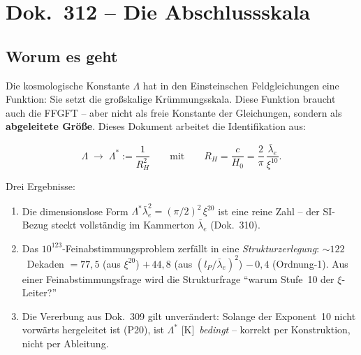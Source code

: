 \maketitle
\tableofcontents

\chapter*{Dok.~312 -- Die Abschlussskala}

\section*{Worum es geht}

Die kosmologische Konstante $\Lambda$ hat in den Einsteinschen
Feldgleichungen eine Funktion: Sie setzt die großskalige Krümmungsskala.
Diese Funktion braucht auch die FFGFT -- aber nicht als freie Konstante
der Gleichungen, sondern als \textbf{abgeleitete Größe}. Dieses Dokument
arbeitet die Identifikation aus:

\[
  \Lambda \;\longrightarrow\; \Lambda^{*} := \frac{1}{R_H^2}
  \qquad\text{mit}\qquad
  R_H = \frac{c}{H_0} = \frac{2}{\pi}\,\frac{\bar\lambda_e}{\xi^{10}}.
\]

Drei Ergebnisse:
\begin{enumerate}
  \item Die dimensionslose Form
        $\Lambda^{*}\bar\lambda_e^{2} = (\pi/2)^{2}\,\xi^{20}$
        ist eine reine Zahl -- der SI-Bezug steckt vollständig im
        Kammerton $\bar\lambda_e$ (Dok.~310).
  \item Das $10^{123}$-Feinabstimmungsproblem zerfällt in eine
        \emph{Strukturzerlegung}: $\sim\!122$~Dekaden
        $= 77{,}5$ (aus $\xi^{20}$) $+\,44{,}8$ (aus
        $(l_P/\bar\lambda_e)^2$) $-\,0{,}4$ (Ordnung-1). Aus einer
        Feinabstimmungsfrage wird die Strukturfrage
        \enquote{warum Stufe~10 der $\xi$-Leiter?}
  \item Die Vererbung aus Dok.~309 gilt unverändert: Solange der
        Exponent~10 nicht vorwärts hergeleitet ist (P20), ist
        $\Lambda^{*}$ [K]~\emph{bedingt} -- korrekt per Konstruktion,
        nicht per Ableitung.
\end{enumerate}

